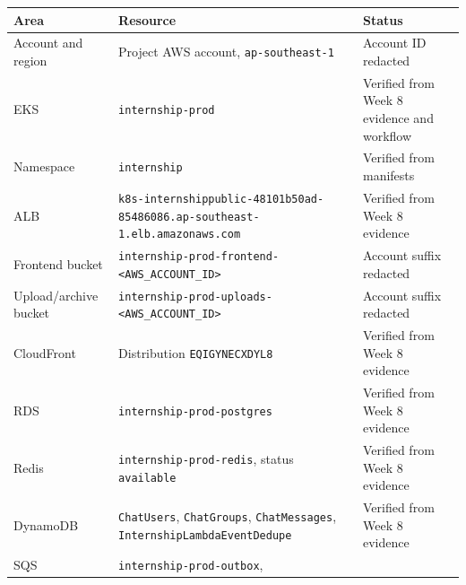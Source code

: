 {
\begingroup
\small
\setlength{\tabcolsep}{3pt}
\renewcommand{\arraystretch}{1.15}
\begin{longtable}{@{}
  >{\raggedright\arraybackslash}p{}
  >{\raggedright\arraybackslash}p{}
  >{\raggedright\arraybackslash}p{}@{}}
\toprule\noalign{}
\begin{minipage}[b]{\linewidth}\raggedright
Area
\end{minipage} & \begin{minipage}[b]{\linewidth}\raggedright
Resource
\end{minipage} & \begin{minipage}[b]{\linewidth}\raggedright
Status
\end{minipage} \\
\midrule\noalign{}
\endhead
\bottomrule\noalign{}
\endlastfoot
Account and region & Project AWS account, \texttt{ap-\allowbreak{}southeast-\allowbreak{}1} &
Account ID redacted \\
EKS & \texttt{internship-\allowbreak{}prod} & Verified from Week 8 evidence and
workflow \\
Namespace & \texttt{internship} & Verified from manifests \\
ALB &
\texttt{k8s-\allowbreak{}internshippublic-\allowbreak{}48101b50ad-\allowbreak{}85486086.\allowbreak{}ap-\allowbreak{}southeast-\allowbreak{}1.\allowbreak{}elb.\allowbreak{}amazonaws.\allowbreak{}com}
& Verified from Week 8 evidence \\
Frontend bucket &
\texttt{internship-prod-frontend-\textless{}AWS\_ACCOUNT\_ID\textgreater{}}
& Account suffix redacted \\
Upload/archive bucket &
\texttt{internship-prod-uploads-\textless{}AWS\_ACCOUNT\_ID\textgreater{}}
& Account suffix redacted \\
CloudFront & Distribution \texttt{EQIGYNECXDYL8} & Verified from Week 8
evidence \\
RDS & \texttt{internship-\allowbreak{}prod-\allowbreak{}postgres} & Verified from Week 8
evidence \\
Redis & \texttt{internship-\allowbreak{}prod-\allowbreak{}redis}, status \texttt{available} &
Verified from Week 8 evidence \\
DynamoDB & \texttt{ChatUsers}, \texttt{ChatGroups},
\texttt{ChatMessages}, \texttt{InternshipLambdaEventDedupe} & Verified
from Week 8 evidence \\
SQS & \texttt{internship-\allowbreak{}prod-\allowbreak{}outbox},

\end{longtable}}
